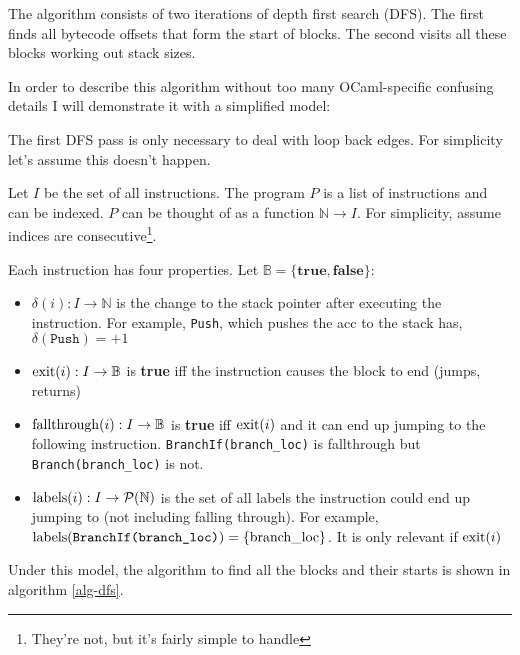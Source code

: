 The algorithm consists of two iterations of depth first search (DFS). The first finds all bytecode
offsets that form the start of blocks. The second visits all these blocks working out stack sizes.

In order to describe this algorithm without too many OCaml-specific confusing details I will
demonstrate it with
a simplified model:

The first DFS pass is only necessary to deal with loop back edges. For simplicity let's assume this
doesn't happen.

Let \(I\) be the set of all instructions. The program \(P\) is a list of instructions and can be
indexed. \(P\) can be thought of as a function \(\mathbb{N} \to I\).
For simplicity, assume indices are consecutive\footnote{They're not, but it's fairly simple to
      handle}.

Each instruction has four properties. Let $\mathbb{B} = \{ \textbf{true}, \textbf{false} \}$:

\begin{itemize}
      \item \(\delta(i) : I \to \mathbb{N} \) is the change to the stack pointer after executing
            the
            instruction. For
            example, \texttt{Push}, which pushes the acc to the stack has, \(\delta(\texttt{Push})
            =
            +1\)
      \item \(\operatorname{exit}(i) : I \to \mathbb{B} \) is \textbf{true} iff the instruction causes
            the block to end
            (jumps, returns)
      \item \(\operatorname{fallthrough}(i) : I \to \mathbb{B} \) is \textbf{true} iff \(\operatorname{exit}(i)\)
            and it can end up
            jumping to the following instruction. \texttt{BranchIf(branch\_loc)} is fallthrough but
            \texttt{Branch(branch\_loc)} is not.
      \item \(\operatorname{labels}(i) : I \to \mathcal{P}(\mathbb{N}) \) is the set of all labels the
            instruction could end up jumping to
            (not
            including falling through). For example, \(\operatorname{labels}(\texttt{BranchIf(branch\_loc)}) =
            \{\text{branch\_loc}\}\). It is only relevant if \(\operatorname{exit}(i)\)
\end{itemize}

Under this model, the algorithm to find all the blocks and their starts is shown in algorithm
\ref{alg-dfs}.

